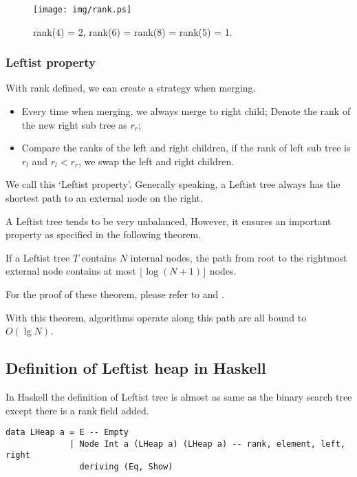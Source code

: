 \documentclass{article}
\begin{document}
\begin{figure}[htbp]
   \begin{center}
     \texttt{[image: img/rank.ps]}
     \caption{rank(4) = 2, rank(6) = rank(8) = rank(5) = 1.} \label{fig:rank}
   \end{center}
\end{figure}

\subsubsection{Leftist property}

With rank defined, we can create a strategy when merging.

\begin{itemize}
\item Every time when merging, we always merge to right child; Denote the rank
of the new right sub tree as $r_r$;
\item Compare the ranks of the left and right children, if the rank of 
left sub tree is $r_l$ and $r_l < r_r$, we swap the left and right children.
\end{itemize}

We call this `Leftist property'. Generally speaking, a Leftist tree always
has the shortest path to an external node on the right.

A Leftist tree tends to be very unbalanced, However, it ensures an important
property as specified in the following theorem.

If a Leftist tree $T$ contains $N$ internal nodes, the path from root to the
rightmost external node contains at most $\lfloor \log{(N+1)} \rfloor$ nodes.

For the proof of these theorem, please refer to \cite{brono-book} and \cite{TAOCP}.

With this theorem, algorithms operate along this path are all bound to $O(\lg N)$.

\subsection*{Definition of Leftist heap in Haskell}

In Haskell the definition of Leftist tree is almost as same as the
binary search tree except there is a rank field added.

\lstset{language=Haskell}
\begin{lstlisting}
data LHeap a = E -- Empty 
             | Node Int a (LHeap a) (LHeap a) -- rank, element, left, right
               deriving (Eq, Show)
\end{lstlisting}
\end{document}
